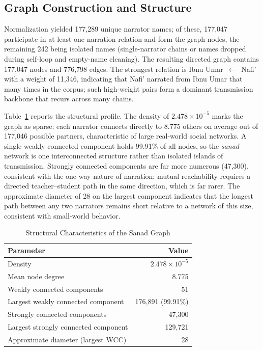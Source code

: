 \documentclass[conference]{IEEEtran}
\begin{document}
\subsection{Graph Construction and Structure}

Normalization yielded 177{,}289 unique narrator names; of these, 177{,}047
participate in at least one narration relation and form the graph nodes, the
remaining 242 being isolated names (single-narrator chains or names dropped
during self-loop and empty-name cleaning). The resulting directed graph contains
177{,}047 nodes and 776{,}798 edges. The strongest relation is Ibnu
Umar~$\leftarrow$~Nafi' with a weight of 11{,}346, indicating that Nafi'
narrated from Ibnu Umar that many times in the corpus; such high-weight pairs
form a dominant transmission backbone that recurs across many chains.

Table~\ref{tab:struktur} reports the structural profile. The density of
$2.478 \times 10^{-5}$ marks the graph as sparse: each narrator connects directly
to 8.775 others on average out of 177{,}046 possible partners, characteristic of
large real-world social networks. A single weakly connected component holds
99.91\% of all nodes, so the \textit{sanad} network is one interconnected
structure rather than isolated islands of transmission. Strongly connected
components are far more numerous (47{,}300), consistent with the one-way nature of
narration: mutual reachability requires a directed teacher--student path in the
same direction, which is far rarer. The approximate diameter of 28 on the largest
component indicates that the longest path between any two narrators remains short
relative to a network of this size, consistent with small-world behavior.

\begin{table}[!t]
\caption{Structural Characteristics of the Sanad Graph}
\label{tab:struktur}
\centering
\renewcommand{\arraystretch}{1.3}
\begin{tabular}{lr}
\toprule
Parameter & Value \\
\midrule
Density                              & $2.478 \times 10^{-5}$ \\
Mean node degree                     & 8.775 \\
Weakly connected components          & 51 \\
Largest weakly connected component   & 176{,}891 (99.91\%) \\
Strongly connected components        & 47{,}300 \\
Largest strongly connected component & 129{,}721 \\
Approximate diameter (largest WCC)   & 28 \\
\bottomrule
\end{tabular}
\end{table}
\end{document}
